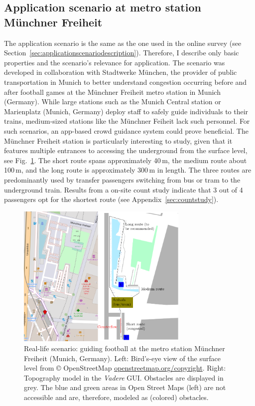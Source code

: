 \subsection{Application scenario at metro station Münchner Freiheit}

The application scenario is the same as the one used in the online survey (see Section~\ref{sec:applicationscenariodescription}). Therefore, I describe only basic properties and the scenario's relevance for application.
The scenario was developed in collaboration with Stadtwerke München, the provider of public transportation in Munich to better understand congestion occurring before and after football games at the Münchner Freiheit metro station in Munich (Germany). While large stations such as the Munich Central station or Marienplatz (Munich, Germany) deploy staff to safely guide individuals to their trains, medium-sized stations like the Münchner Feiheit lack such personnel. For  such scenarios, an app-based crowd guidance system could prove beneficial.
The Münchner Freiheit station is particularly interesting to study, given that it features multiple entrances to accessing the underground from the surface level, see Fig.~\ref{fig:reallifeusecase}. The short route spans approximately 40\,m, the medium route about 100\,m, and the long route is approximately 300\,m in length. The three routes are predominantly used by transfer passengers switching from bus or tram to the underground train.  Results from a on-site count study indicate that 3 out of 4 passengers opt for the shortest route (see Appendix~\ref{sec:countstudy}).

\begin{figure}[H]
\centering
\includegraphics[width=0.73\textwidth]{../figures/investigation/RealisticScenario/applicationusecase.pdf} 
\caption[Real-life application scenario: rerouting pedestrians at the metro station Münchner Freiheit (Munich) ]{Real-life scenario: guiding football at the metro station Münchner Freiheit (Munich, Germany). Left: Bird's-eye view of the surface level from © OpenStreetMap \url{openstreetmap.org/copyright}. Right: Topography model in the \textit{Vadere} GUI. Obstacles are displayed in grey. The blue and green areas in Open Street Maps (left) are not accessible and are, therefore, modeled as (colored) obstacles.}
\label{fig:reallifeusecase}
\end{figure}





